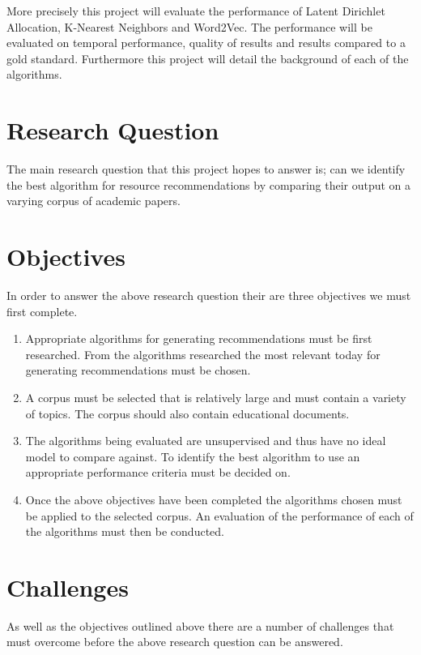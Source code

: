 More precisely this project will evaluate the performance of Latent Dirichlet Allocation, K-Nearest Neighbors and Word2Vec.
The performance will be evaluated on temporal performance, quality of results and results compared to a gold standard.
Furthermore this project will detail the background of each of the algorithms.

\section{Research Question}
The main research question that this project hopes to answer is; can we identify the best algorithm for resource recommendations by comparing their output on a varying corpus of academic papers.

\section{Objectives}
In order to answer the above research question their are three objectives we must first complete.

\begin{enumerate}
    \item Appropriate algorithms for generating recommendations must be first researched.
    From the algorithms researched the most relevant today for generating recommendations must be chosen.

    \item A corpus must be selected that is relatively large and must contain a variety of topics.
    The corpus should also contain educational documents.

    \item The algorithms being evaluated are unsupervised and thus have no ideal model to compare against.
    To identify the best algorithm to use an appropriate performance criteria must be decided on.

    \item Once the above objectives have been completed the algorithms chosen must be applied to the selected corpus.
    An evaluation of the performance of each of the algorithms must then be conducted.
\end{enumerate}

\section{Challenges}
As well as the objectives outlined above there are a number of challenges that must overcome before the above research question can be answered.

